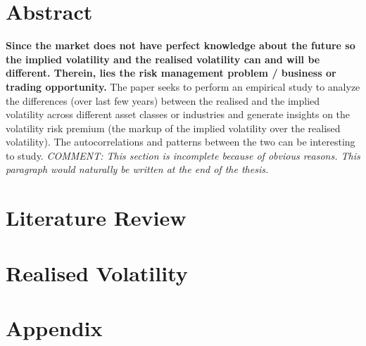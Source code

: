 \documentclass{article}[16pt]
\begin{document}
\onehalfspacing


\tableofcontents

\newpage
\section{Abstract}

\textbf{Since the market does not have perfect knowledge about the future so the implied volatility and the realised volatility can and will be different. Therein, lies the risk management problem / business or trading opportunity.}
The paper seeks to perform an empirical study to analyze the differences (over last few years) between the realised and the implied volatility across different asset classes or industries and generate insights on the volatility risk premium (the markup of the implied volatility over the realised volatility). The autocorrelations and patterns between the two can be interesting to study. \textit{COMMENT: This section is incomplete because of obvious reasons. This paragraph would naturally be written at the end of the thesis.}

\section[Literature Review]{Literature Review}



\section[Realised Volatility]{Realised Volatility}





\printbibliography
\section{Appendix}

\end{document}
